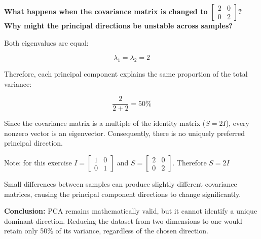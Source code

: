 \documentclass[11pt]{article}
\begin{document}
\textbf{What happens when the covariance matrix is changed to
\(\begin{bmatrix}2&0\\0&2\end{bmatrix}\)? Why might the principal
directions be unstable across samples?}

Both eigenvalues are equal:

\[
\lambda_1=\lambda_2=2
\]

Therefore, each principal component explains the same proportion of the
total variance:

\[
\frac{2}{2+2}=50\%
\]

Since the covariance matrix is a multiple of the identity matrix
(\(S=2I\)), every nonzero vector is an eigenvector. Consequently, there
is no uniquely preferred principal direction.

Note: for this exercise \(I = \begin{bmatrix}1&0\\0&1\end{bmatrix}\) and
\(S = \begin{bmatrix}2&0\\0&2\end{bmatrix}\). Therefore \(S=2I\)

Small differences between samples can produce slightly different
covariance matrices, causing the principal component directions to
change significantly.

\textbf{Conclusion:} PCA remains mathematically valid, but it cannot
identify a unique dominant direction. Reducing the dataset from two
dimensions to one would retain only 50\% of its variance, regardless of
the chosen direction.
\end{document}

